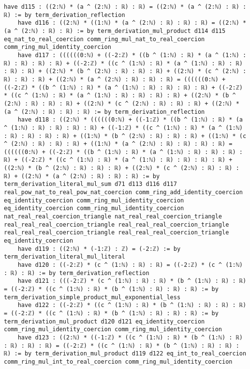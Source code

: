 \documentclass{article}
\begin{document}
\begin{tcolorbox}[colback=white!10, width=\linewidth]
\begin{lstlisting}[language=Lean4]
    have d115 : ((2:ℕ) * (a ^ (2:ℕ) : ℝ) : ℝ) = ((2:ℕ) * (a ^ (2:ℕ) : ℝ) : ℝ) := by term_derivation_reflection
    have d116 : ((2:ℕ) * ((1:ℕ) * (a ^ (2:ℕ) : ℝ) : ℝ) : ℝ) = ((2:ℕ) * (a ^ (2:ℕ) : ℝ) : ℝ) := by term_derivation_mul_product d114 d115 eq_nat_to_real_coercion comm_ring_mul_nat_to_real_coercion comm_ring_mul_identity_coercion
    have d117 : ((((((0:ℕ) + ((-2:ℤ) * ((b ^ (1:ℕ) : ℝ) * (a ^ (1:ℕ) : ℝ) : ℝ) : ℝ) : ℝ) + ((-2:ℤ) * ((c ^ (1:ℕ) : ℝ) * (a ^ (1:ℕ) : ℝ) : ℝ) : ℝ) : ℝ) + ((2:ℕ) * (b ^ (2:ℕ) : ℝ) : ℝ) : ℝ) + ((2:ℕ) * (c ^ (2:ℕ) : ℝ) : ℝ) : ℝ) + ((2:ℕ) * (a ^ (2:ℕ) : ℝ) : ℝ) : ℝ) = ((((((0:ℕ) + ((-2:ℤ) * ((b ^ (1:ℕ) : ℝ) * (a ^ (1:ℕ) : ℝ) : ℝ) : ℝ) : ℝ) + ((-2:ℤ) * ((c ^ (1:ℕ) : ℝ) * (a ^ (1:ℕ) : ℝ) : ℝ) : ℝ) : ℝ) + ((2:ℕ) * (b ^ (2:ℕ) : ℝ) : ℝ) : ℝ) + ((2:ℕ) * (c ^ (2:ℕ) : ℝ) : ℝ) : ℝ) + ((2:ℕ) * (a ^ (2:ℕ) : ℝ) : ℝ) : ℝ) := by term_derivation_reflection
    have d118 : ((2:ℕ) * ((((((0:ℕ) + ((-1:ℤ) * ((b ^ (1:ℕ) : ℝ) * (a ^ (1:ℕ) : ℝ) : ℝ) : ℝ) : ℝ) + ((-1:ℤ) * ((c ^ (1:ℕ) : ℝ) * (a ^ (1:ℕ) : ℝ) : ℝ) : ℝ) : ℝ) + ((1:ℕ) * (b ^ (2:ℕ) : ℝ) : ℝ) : ℝ) + ((1:ℕ) * (c ^ (2:ℕ) : ℝ) : ℝ) : ℝ) + ((1:ℕ) * (a ^ (2:ℕ) : ℝ) : ℝ) : ℝ) : ℝ) = ((((((0:ℕ) + ((-2:ℤ) * ((b ^ (1:ℕ) : ℝ) * (a ^ (1:ℕ) : ℝ) : ℝ) : ℝ) : ℝ) + ((-2:ℤ) * ((c ^ (1:ℕ) : ℝ) * (a ^ (1:ℕ) : ℝ) : ℝ) : ℝ) : ℝ) + ((2:ℕ) * (b ^ (2:ℕ) : ℝ) : ℝ) : ℝ) + ((2:ℕ) * (c ^ (2:ℕ) : ℝ) : ℝ) : ℝ) + ((2:ℕ) * (a ^ (2:ℕ) : ℝ) : ℝ) : ℝ) := by term_derivation_literal_mul_sum d71 d113 d116 d117 real_pow_nat_to_real_pow_nat_coercion comm_ring_add_identity_coercion eq_identity_coercion comm_ring_mul_identity_coercion eq_identity_coercion comm_ring_mul_identity_coercion nat_real_real_coercion_triangle nat_real_real_coercion_triangle real_real_real_coercion_triangle real_real_real_coercion_triangle real_real_real_coercion_triangle real_real_real_coercion_triangle eq_identity_coercion
    have d119 : ((2:ℕ) * (-1:ℤ) : ℤ) = (-2:ℤ) := by term_derivation_literal_mul_literal
    have d120 : ((-2:ℤ) * (c ^ (1:ℕ) : ℝ) : ℝ) = ((-2:ℤ) * (c ^ (1:ℕ) : ℝ) : ℝ) := by term_derivation_reflection
    have d121 : (((-2:ℤ) * (c ^ (1:ℕ) : ℝ) : ℝ) * (b ^ (1:ℕ) : ℝ) : ℝ) = ((-2:ℤ) * ((c ^ (1:ℕ) : ℝ) * (b ^ (1:ℕ) : ℝ) : ℝ) : ℝ) := by term_derivation_simple_product_mul_exponential_less
    have d122 : ((-2:ℤ) * ((c ^ (1:ℕ) : ℝ) * (b ^ (1:ℕ) : ℝ) : ℝ) : ℝ) = ((-2:ℤ) * ((c ^ (1:ℕ) : ℝ) * (b ^ (1:ℕ) : ℝ) : ℝ) : ℝ) := by term_derivation_mul_product d120 d121 eq_identity_coercion comm_ring_mul_identity_coercion comm_ring_mul_identity_coercion
    have d123 : ((2:ℕ) * ((-1:ℤ) * ((c ^ (1:ℕ) : ℝ) * (b ^ (1:ℕ) : ℝ) : ℝ) : ℝ) : ℝ) = ((-2:ℤ) * ((c ^ (1:ℕ) : ℝ) * (b ^ (1:ℕ) : ℝ) : ℝ) : ℝ) := by term_derivation_mul_product d119 d122 eq_int_to_real_coercion comm_ring_mul_int_to_real_coercion comm_ring_mul_identity_coercion

\end{lstlisting}
\end{tcolorbox}
\end{document}
